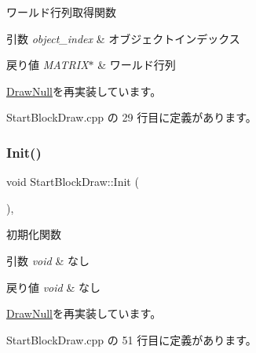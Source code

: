ワールド行列取得関数 


\begin{DoxyParams}{引数}
{\em object\+\_\+index} & オブジェクトインデックス \\
\hline
\end{DoxyParams}

\begin{DoxyRetVals}{戻り値}
{\em M\+A\+T\+R\+I\+X$\ast$} & ワールド行列 \\
\hline
\end{DoxyRetVals}


\mbox{\hyperlink{class_draw_null_a9aac059eb3b5d1f77e8bd3aa0647cff9}{Draw\+Null}}を再実装しています。



 Start\+Block\+Draw.\+cpp の 29 行目に定義があります。

\mbox{\label{class_start_block_draw_aae788a1d8d023cf387839c4bd9b74a1c}} 
\subsubsection{\texorpdfstring{Init()}{Init()}}
{\footnotesize\ttfamily void Start\+Block\+Draw\+::\+Init (\begin{DoxyParamCaption}{ }\end{DoxyParamCaption})\hspace{0.3cm}{\ttfamily [override]}, {\ttfamily [virtual]}}



初期化関数 


\begin{DoxyParams}{引数}
{\em void} & なし \\
\hline
\end{DoxyParams}

\begin{DoxyRetVals}{戻り値}
{\em void} & なし \\
\hline
\end{DoxyRetVals}


\mbox{\hyperlink{class_draw_null_a20aef1e54c1a158b741bfd731e18efdf}{Draw\+Null}}を再実装しています。



 Start\+Block\+Draw.\+cpp の 51 行目に定義があります。

\mbox{\label{class_start_block_draw_aee2e80725c15a65d085a7effb2a556f4}} 

